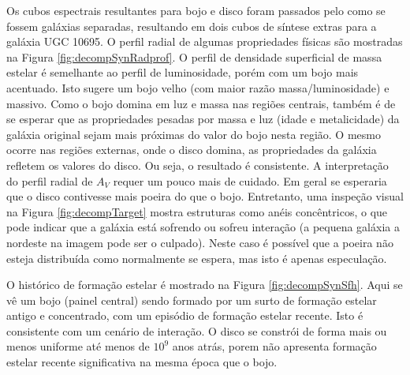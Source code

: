 Os cubos espectrais resultantes para bojo e disco foram passados pelo \starlight
como se fossem galáxias separadas, resultando em dois cubos de síntese extras
para a galáxia UGC 10695. O perfil radial de algumas propriedades físicas são
mostradas na Figura \ref{fig:decompSynRadprof}. O perfil de densidade
superficial de massa estelar é semelhante ao perfil de luminosidade, porém com
um bojo mais acentuado. Isto sugere um bojo velho (com maior razão
massa/luminosidade) e massivo. Como o bojo domina em luz e massa nas regiões
centrais, também é de se esperar que as propriedades pesadas por massa e luz
(idade e metalicidade) da galáxia original sejam mais próximas do valor do bojo
nesta região. O mesmo ocorre nas regiões externas, onde o disco domina, as
propriedades da galáxia refletem os valores do disco. Ou seja, o resultado é
consistente.
A interpretação do perfil radial de $A_V$ requer um pouco mais de cuidado. Em
geral se esperaria que o disco contivesse mais poeira do que o bojo.
Entretanto, uma inspeção visual na Figura \ref{fig:decompTarget} mostra
estruturas como anéis concêntricos, o que pode indicar que a galáxia está
sofrendo ou sofreu interação (a pequena galáxia a nordeste na imagem pode ser o
culpado). Neste caso é possível que a poeira não esteja distribuída como
normalmente se espera, mas isto é apenas especulação.

O histórico de formação estelar é mostrado na Figura \ref{fig:decompSynSfh}.
Aqui se vê um bojo (painel central) sendo formado por um surto de formação
estelar antigo e concentrado, com um episódio de formação estelar recente. Isto
é consistente com um cenário de interação. O disco se constrói de forma mais ou
menos uniforme até menos de $10^9$ anos atrás, porem não apresenta formação
estelar recente significativa na mesma época que o bojo.

